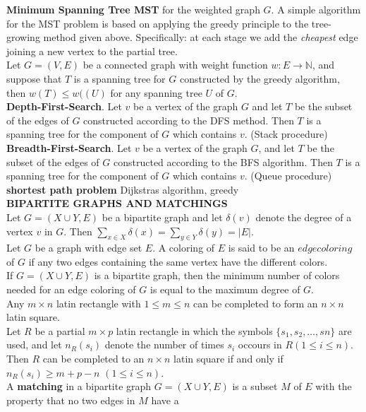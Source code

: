 \documentclass[10pt,landscape]{article}
\begin{document}
\begin{multicols}{4}
\textbf{Minimum Spanning Tree MST} for the weighted graph $G$. A
simple algorithm for the MST problem is based on applying the greedy
principle to the tree-growing method given above. Specifically: at
each stage we add the \textit{cheapest} edge joining a new vertex to
the partial tree.\\
Let $G = (V,E)$ be a connected graph with weight function $w: E \to
\mathbb{N}$, and suppose that $T$ is a spanning tree for $G$
constructed by the greedy algorithm, then $w(T) \leq w((U)$ for any
spanning tree $U$ of $G$.\\
\textbf{Depth-First-Search}. Let $v$ be a vertex of the graph $G$ and
let $T$ be the subset of the edges of $G$ constructed according to the
DFS method. Then $T$ is a spanning tree for the component of $G$ which
contains $v$. (Stack procedure)\\
\textbf{Breadth-First-Search}. Let $v$ be a vertex of the graph $G$,
and let $T$ be  the subset of the edges of $G$ constructed according
to the BFS algorithm. Then $T$ is a spanning tree for the component of
$G$ which contains $v$. (Queue procedure)\\
\textbf{shortest path problem} Dijkstras algorithm, greedy\\
\textbf{BIPARTITE GRAPHS AND MATCHINGS}\\
Let $G = (X \cup Y, E)$ be a bipartite graph and let $\delta(v)$
denote the degree of a vertex $v$ in $G$. Then $\displaystyle\sum_{x
  \in X} \delta(x) = \displaystyle\sum_{y \in Y} \delta(y) = |E|$.\\
Let $G$ be a graph with edge set $E$. A coloring of $E$ is said to be
an $edge coloring$ of $G$ if any two edges containing the same vertex
have the different colors.\\
If $G = (X \cup Y, E)$ is a bipartite graph, then the minimum number
of colors needed for an edge coloring of $G$ is equal to the maximum
degree of $G$.\\
Any $m \times n$ latin rectangle with $1 \leq m \leq n$ can be
completed to form an $n \times n$ latin square.\\
Let $R$ be a partial $m \times p$ latin rectangle in which the symbols
$\{s_{1}, s_{2}, \dots,s{n}\}$ are used, and let $n_{R}(s_{i})$ denote
the number of times $s_{i}$ occours in $R(1 \leq i \leq n)$. Then $R$
can be completed to an $n \times n$ latin square if and only if
$n_{R}(s_{i}) \geq m + p - n$ $(1 \leq i \leq n)$.\\
A \textbf{matching} in a bipartite graph $G = (X \cup Y, E)$ is a
subset $M$ of $E$ with the property that no two edges in $M$ have a

\end{multicols}
\end{document}
